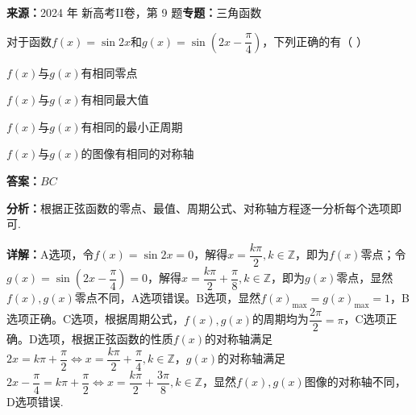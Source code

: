 \begin{question}[points=6]
\textbf{来源：}2024 年 新高考II卷，第 9 题\quad \textbf{专题：}三角函数\par
对于函数$f(x)=\sin 2x$和$g(x)=\sin(2x-\dfrac{\pi}{4})$，下列正确的有（ ）
\begin{choices}
  \item $f(x)$与$g(x)$有相同零点
  \item $f(x)$与$g(x)$有相同最大值
  \item $f(x)$与$g(x)$有相同的最小正周期
  \item $f(x)$与$g(x)$的图像有相同的对称轴
\end{choices}
\begin{solution}
\textbf{答案：}$BC$

\textbf{分析：}根据正弦函数的零点、最值、周期公式、对称轴方程逐一分析每个选项即可.

\textbf{详解：}A选项，令$f(x)=\sin 2x=0$，解得$x=\dfrac{k\pi}{2},k\in\mathbb{Z}$，即为$f(x)$零点；令$g(x)=\sin(2x-\dfrac{\pi}{4})=0$，解得$x=\dfrac{k\pi}{2}+\dfrac{\pi}{8},k\in\mathbb{Z}$，即为$g(x)$零点，显然$f(x),g(x)$零点不同，A选项错误。B选项，显然$f(x)_{\max}=g(x)_{\max}=1$，B选项正确。C选项，根据周期公式，$f(x),g(x)$的周期均为$\dfrac{2\pi}{2}=\pi$，C选项正确。D选项，根据正弦函数的性质$f(x)$的对称轴满足$2x=k\pi+\dfrac{\pi}{2}\Leftrightarrow x=\dfrac{k\pi}{2}+\dfrac{\pi}{4},k\in\mathbb{Z}$，$g(x)$的对称轴满足$2x-\dfrac{\pi}{4}=k\pi+\dfrac{\pi}{2}\Leftrightarrow x=\dfrac{k\pi}{2}+\dfrac{3\pi}{8},k\in\mathbb{Z}$，显然$f(x),g(x)$图像的对称轴不同，D选项错误.
\end{solution}
\end{question}

